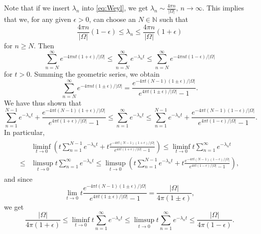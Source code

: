 \documentclass{amsart}
\theoremstyle{definition}
\begin{document}
Note that if we insert $\lambda_n$ into \eqref{eq:Weyl}, we get $\lambda_n \sim \frac{4\pi n}{|\Omega|}, \, n \to \infty$. This implies that we, for any given $\epsilon > 0$, can choose an $N \in \mathbb{N}$ such that
\begin{equation} \label{eq:epsN}
    \frac{4\pi n}{|\Omega|}(1-\epsilon) \leq \lambda_n \leq \frac{4\pi n}{|\Omega|}(1+\epsilon)
\end{equation}
for $n \geq N$. Then
\begin{equation} \label{eq:sum_epsN}
    \sum_{n = N}^\infty e^{-4\pi nt(1+\epsilon)/|\Omega|} \leq \sum_{n = N}^\infty e^{-\lambda_n t} \leq \sum_{n = N}^\infty e^{-4\pi nt(1-\epsilon)/|\Omega|}
\end{equation}
for $t > 0$. Summing the geometric series, we obtain
\begin{equation*}
    \sum_{n = N}^\infty e^{-4\pi nt(1\pm\epsilon)/|\Omega|} = \frac{e^{-4\pi t(N-1)(1\pm\epsilon)/|\Omega|}}{e^{4\pi t(1\pm\epsilon)/|\Omega|} - 1}.
\end{equation*}
We have thus shown that
\begin{equation*}
    \sum_{n=1}^{N-1}e^{-\lambda_n t} + \frac{e^{-4\pi t(N-1)(1+\epsilon)/|\Omega|}}{e^{4\pi t(1+\epsilon)/|\Omega|} - 1} \leq \sum_{n=1}^\infty e^{-\lambda_n t} \leq \sum_{n=1}^{N-1} e^{-\lambda_n t} + \frac{e^{-4\pi t(N-1)(1-\epsilon)/|\Omega|}}{e^{4\pi t(1-\epsilon)/|\Omega|} - 1}.
\end{equation*}
In particular,
\begin{align*}
    \begin{split}
        &\liminf_{t \to 0}\left(t\sum_{n=1}^{N-1}e^{-\lambda_n t} + t\frac{e^{-4\pi t(N-1)(1+\epsilon)/|\Omega|}}{e^{4\pi t(1+\epsilon)/|\Omega|} - 1}\right) \leq \liminf_{t\to 0} t\sum_{n=1}^\infty e^{-\lambda_n t} \\ \leq &\limsup_{t \to 0}t\sum_{n=1}^\infty e^{-\lambda_n t} \leq \limsup_{t \to 0} \left(t\sum_{n=1}^{N-1} e^{-\lambda_n t} + t\frac{e^{-4\pi t(N-1)(1-\epsilon)/|\Omega|}}{e^{4\pi t(1-\epsilon)/|\Omega|} - 1}\right),
    \end{split}
\end{align*}
and since
\begin{equation*}
    \lim_{t\to 0} t\frac{e^{-4\pi t(N-1)(1\pm\epsilon)/|\Omega|}}{e^{4\pi t(1\pm\epsilon)/|\Omega|} - 1} = \frac{|\Omega|}{4\pi(1\pm \epsilon)},
\end{equation*}
we get
\begin{equation*}
    \frac{|\Omega|}{4\pi(1+ \epsilon)} \leq \liminf_{t\to 0} t\sum_{n=1}^\infty e^{-\lambda_n t} \leq \limsup_{t\to 0} t\sum_{n=1}^\infty e^{-\lambda_n t} \leq \frac{|\Omega|}{4\pi(1- \epsilon)}.
\end{equation*}
\end{document}
